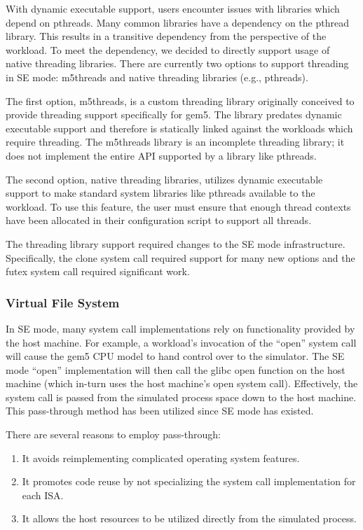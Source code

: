 With dynamic executable support, users encounter issues with libraries which depend on pthreads.
Many common libraries have a dependency on the pthread library.
This results in a transitive dependency from the perspective of the workload.
To meet the dependency, we decided to directly support usage of native threading libraries.
There are currently two options to support threading in SE mode: m5threads and native threading libraries (e.g., pthreads).

The first option, m5threads, is a custom threading library originally conceived to provide threading support specifically for gem5.
The library predates dynamic executable support and therefore is statically linked against the workloads which require threading.
The m5threads library is an incomplete threading library; it does not implement the entire API supported by a library like pthreads.

The second option, native threading libraries, utilizes dynamic executable support to make standard system libraries like pthreads available to the workload.
To use this feature, the user must ensure that enough thread contexts have been allocated in their configuration script to support all threads.

The threading library support required changes to the SE mode infrastructure.
Specifically, the clone system call required support for many new options and the futex system call required significant work.

\subsubsection{Virtual File System}
\label{sec:vfs}

In SE mode, many system call implementations rely on functionality provided by the host machine.
For example, a workload's invocation of the ``open'' system call will cause the gem5 CPU model to hand control over to the simulator.
The SE mode ``open'' implementation will then call the glibc open function on the host machine (which in-turn uses the host machine's open system call).
Effectively, the system call is passed from the simulated process space down to the host machine.
This pass-through method has been utilized since SE mode has existed.

There are several reasons to employ pass-through:
\begin{enumerate}
    \item It avoids reimplementing complicated operating system features.
    \item It promotes code reuse by not specializing the system call implementation for each ISA.
    \item It allows the host resources to be utilized directly from the simulated process.
\end{enumerate}

